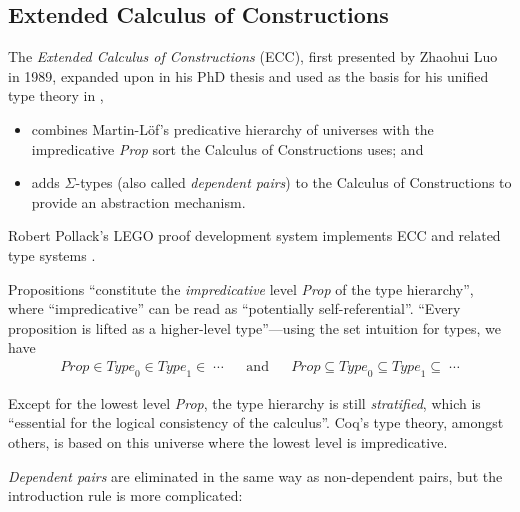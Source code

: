 \documentclass[12pt,toc=bibliography,numbers=noendperiod,
               footnotes=multiple,twoside]{scrartcl}
\begin{document}
\subsection{Extended Calculus of Constructions}

The \emph{Extended Calculus of Constructions} (ECC), first presented by Zhaohui Luo in 1989\autocite{luo_ecc_1989}, expanded upon in his PhD thesis\autocite{luo_extended_1990} and used as the basis for his unified type theory in \autocite{luo_computation_1994},

\begin{itemize}
\item combines Martin-Löf's predicative hierarchy of universes with the impredicative \textit{Prop} sort the Calculus of Constructions uses; and
\item adds \(\Sigma\)-types (also called \emph{dependent pairs}) to the Calculus of Constructions to provide an abstraction mechanism.
\end{itemize}

Robert Pollack's LEGO proof development system implements ECC and related type systems \autocite{pollack_theory_1994}.

Propositions \enquote{constitute the \emph{impredicative} level \textit{Prop} of the type hierarchy}, where \enquote{impredicative} can be read as \enquote{potentially self-referential}. \enquote{Every proposition is lifted as a higher-level type}---using the set intuition for types, we have
\begin{align*}
\textit{Prop} \in \textit{Type}_0 \in \textit{Type}_1 \in \;\cdots && \textrm{and} &&
\textit{Prop} \subseteq \textit{Type}_0 \subseteq \textit{Type}_1 \subseteq \;\cdots
\end{align*}

Except for the lowest level \textit{Prop}, the type hierarchy is still \emph{stratified}, which is \enquote{essential for the logical consistency of the calculus}. Coq's type theory, amongst others, is based on this universe where the lowest level is impredicative.

\emph{Dependent pairs} are eliminated in the same way as non-dependent pairs, but the introduction rule is more complicated:
\begin{prooftree}
\end{prooftree}
\end{document}

